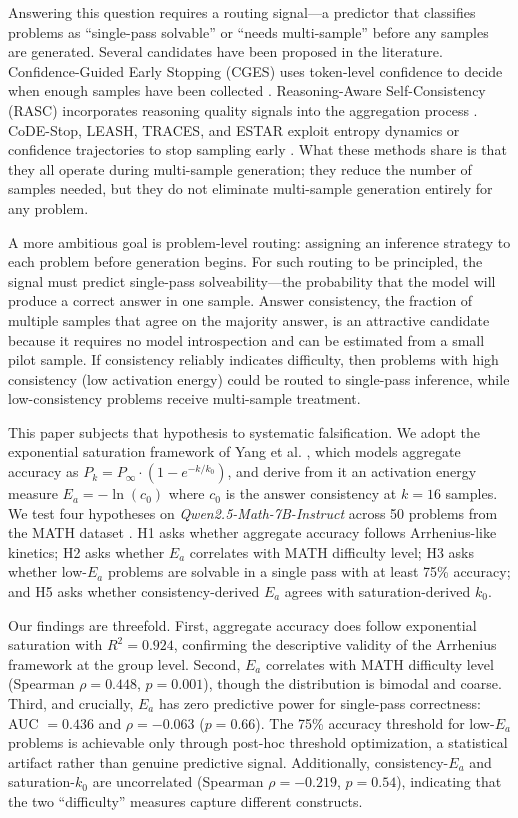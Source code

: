 \documentclass{article}
\begin{document}
Answering this question requires a routing signal---a predictor that classifies problems as ``single-pass solvable'' or ``needs multi-sample'' before any samples are generated. Several candidates have been proposed in the literature. Confidence-Guided Early Stopping (CGES) uses token-level confidence to decide when enough samples have been collected \citep{aghazadeh2023cges}. Reasoning-Aware Self-Consistency (RASC) incorporates reasoning quality signals into the aggregation process \citep{wan2024rasc}. CoDE-Stop, LEASH, TRACES, and ESTAR exploit entropy dynamics or confidence trajectories to stop sampling early \citep{qin2024codestop, leash2024, traces2024, estar2024}. What these methods share is that they all operate during multi-sample generation; they reduce the number of samples needed, but they do not eliminate multi-sample generation entirely for any problem.

A more ambitious goal is problem-level routing: assigning an inference strategy to each problem before generation begins. For such routing to be principled, the signal must predict single-pass solveability---the probability that the model will produce a correct answer in one sample. Answer consistency, the fraction of multiple samples that agree on the majority answer, is an attractive candidate because it requires no model introspection and can be estimated from a small pilot sample. If consistency reliably indicates difficulty, then problems with high consistency (low activation energy) could be routed to single-pass inference, while low-consistency problems receive multi-sample treatment.

This paper subjects that hypothesis to systematic falsification. We adopt the exponential saturation framework of Yang et al. \citep{yang2024probabilistic}, which models aggregate accuracy as $P_k = P_\infty \cdot (1 - e^{-k/k_0})$, and derive from it an activation energy measure $E_a = -\ln(c_0)$ where $c_0$ is the answer consistency at $k = 16$ samples. We test four hypotheses on \textit{Qwen2.5-Math-7B-Instruct} \citep{qwen2024math} across 50 problems from the MATH dataset \citep{hendrycks2021math}. H1 asks whether aggregate accuracy follows Arrhenius-like kinetics; H2 asks whether $E_a$ correlates with MATH difficulty level; H3 asks whether low-$E_a$ problems are solvable in a single pass with at least 75\% accuracy; and H5 asks whether consistency-derived $E_a$ agrees with saturation-derived $k_0$.

Our findings are threefold. First, aggregate accuracy does follow exponential saturation with $R^2 = 0.924$, confirming the descriptive validity of the Arrhenius framework at the group level. Second, $E_a$ correlates with MATH difficulty level (Spearman $\rho = 0.448$, $p = 0.001$), though the distribution is bimodal and coarse. Third, and crucially, $E_a$ has zero predictive power for single-pass correctness: AUC $= 0.436$ and $\rho = -0.063$ ($p = 0.66$). The 75\% accuracy threshold for low-$E_a$ problems is achievable only through post-hoc threshold optimization, a statistical artifact rather than genuine predictive signal. Additionally, consistency-$E_a$ and saturation-$k_0$ are uncorrelated (Spearman $\rho = -0.219$, $p = 0.54$), indicating that the two ``difficulty'' measures capture different constructs.
\end{document}
